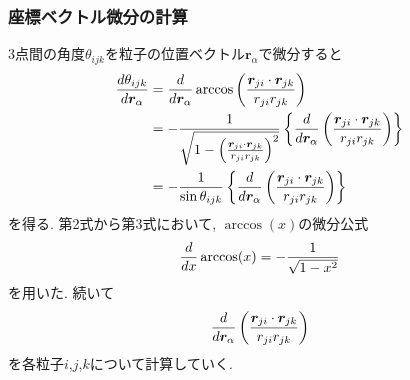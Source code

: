 \subsubsection{座標ベクトル微分の計算}
3点間の角度$\theta_{ijk}$を粒子の位置ベクトル$\bm{r}_{\alpha}$で微分すると
\begin{align}
    \frac{d \theta_{ijk}}{d \bm{r}_{\alpha}}
 &=
    \frac{d}{d \bm{r}_{\alpha}}
    \arccos \left( \frac{\bm{r}_{ji} \cdot \bm{r}_{jk}}{r_{ji} r_{jk}} \right)
 \notag \\
 &=
   -\frac{1}
         {\sqrt{1- \left(\frac{\bm{r}_{ji} \cdot \bm{r}_{jk}}{r_{ji} r_{jk}}\right)^{2}}}
    \left\{
            \frac{d}{d \bm{r}_{\alpha}}
            \left(\frac{\bm{r}_{ji} \cdot \bm{r}_{jk}}{r_{ji} r_{jk}}\right)
    \right\}
 \notag \\
 &=
   -\frac{1}{\sin\theta_{ijk}}
    \left\{
            \frac{d}{d \bm{r}_{\alpha}}
            \left(\frac{\bm{r}_{ji} \cdot \bm{r}_{jk}}{r_{ji} r_{jk}}\right)
    \right\}
  \notag
\end{align}
を得る. 第2式から第3式において, $\arccos(x)$の微分公式
\begin{equation}
\frac{d}{dx}\arccos(x) = - \frac{1}{\sqrt{1-x^2}}
\notag
\end{equation}
を用いた. 続いて
\begin{equation}
 \frac{d}{d \bm{r}_{\alpha}}
 \left(\frac{\bm{r}_{ji} \cdot \bm{r}_{jk}}{r_{ji} r_{jk}}\right)
 \notag
\end{equation}
を各粒子$i$,$j$,$k$について計算していく.

